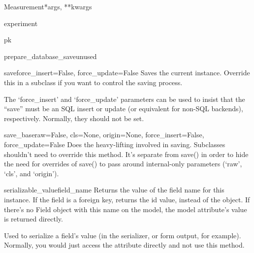 \documentclass[letterpaper,10pt,english]{sphinxmanual}
\begin{document}
\begin{classdesc}{Measurement}{*args, **kwargs}
\hypertarget{data.models.Measurement.experiment}{}\begin{memberdesc}[Measurement]{experiment}\end{memberdesc}

\hypertarget{data.models.Measurement.pk}{}\begin{memberdesc}[Measurement]{pk}\end{memberdesc}

\hypertarget{data.models.Measurement.prepare_database_save}{}\begin{methoddesc}[Measurement]{prepare\_database\_save}{unused}\end{methoddesc}

\hypertarget{data.models.Measurement.save}{}\begin{methoddesc}[Measurement]{save}{force\_insert=False, force\_update=False}
Saves the current instance. Override this in a subclass if you want to
control the saving process.

The `force\_insert' and `force\_update' parameters can be used to insist
that the ``save'' must be an SQL insert or update (or equivalent for
non-SQL backends), respectively. Normally, they should not be set.
\end{methoddesc}

\hypertarget{data.models.Measurement.save_base}{}\begin{methoddesc}[Measurement]{save\_base}{raw=False, cls=None, origin=None, force\_insert=False, force\_update=False}
Does the heavy-lifting involved in saving. Subclasses shouldn't need to
override this method. It's separate from save() in order to hide the
need for overrides of save() to pass around internal-only parameters
(`raw', `cls', and `origin').
\end{methoddesc}

\hypertarget{data.models.Measurement.serializable_value}{}\begin{methoddesc}[Measurement]{serializable\_value}{field\_name}
Returns the value of the field name for this instance. If the field is
a foreign key, returns the id value, instead of the object. If there's
no Field object with this name on the model, the model attribute's
value is returned directly.

Used to serialize a field's value (in the serializer, or form output,
for example). Normally, you would just access the attribute directly
and not use this method.
\end{methoddesc}
\end{classdesc}
\end{document}
